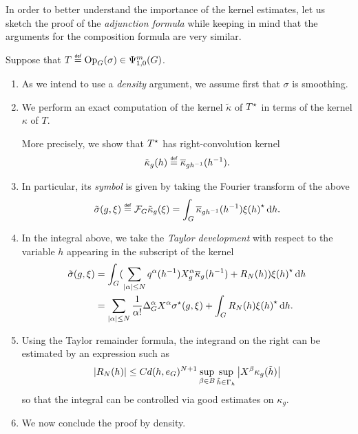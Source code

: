 In order to better understand the importance of the kernel estimates,
let us sketch the proof of the \emph{adjunction formula}
while keeping in mind that the arguments for the composition formula are very similar.

Suppose that $T \defeq \Op(\sigma) \in \OperatorClass m {1, 0}$.

\begin{enumerate}
    \item As we intend to use a \emph{density} argument,
        we assume first that $\sigma$ is smoothing.
    \item We perform an exact computation of the kernel $\tilde \kappa$ of ${T}^\star$ in terms of the kernel $\kappa$ of $T$.

        More precisely, we show that ${T}^\star$ has right-convolution kernel
        \begin{align*}
            \tilde \kappa_g(h) \defeq \conj \kappa_{g h^{-1}}(h^{-1}).
        \end{align*}
    \item
        In particular, its \emph{symbol} is given by taking the Fourier transform of the above
        \begin{align*}
            \tilde \sigma(g, \xi) \defeq \Fourier \tilde \kappa_g(\xi)
            = \int_\Group \conj \kappa_{g h^{-1}}(h^{-1}) \adj{\xi(h)} \dd h.
        \end{align*}
    \item
        In the integral above,
        we take the \emph{Taylor development} with respect to the variable $h$ appearing in the subscript of the kernel
        \begin{align*}
            \tilde \sigma(g, \xi)
            &= \int_\Group (\sum_{\abs \alpha \leq N} q^{\alpha}(h^{-1}) \LeftDifferentialOperator [g] \alpha \conj \kappa_{g}(h^{-1}) + R_N(h)) \adj{\xi(h)} \dd h\\
            &= \sum_{\abs \alpha \leq N} \frac 1 {\alpha!} \DifferenceOperatorOrder \alpha \LeftDifferentialOperator \alpha \adj \sigma(g, \xi) + \int_\Group R_N(h) \adj{\xi(h)} \dd h.
        \end{align*}
    \item
        Using the Taylor remainder formula,
        the integrand on the right can be estimated by an expression such as
        \begin{align*}
            \abs {R_N(h)}
            \leq C d(h, e_\Group)^{N + 1} \sup_{\beta \in B} \sup_{\tilde h \in \Gamma_h} \abs {\LeftDifferentialOperator \beta \kappa_g(\tilde h)}
        \end{align*}
        so that the integral can be controlled via good estimates on $\kappa_g$.
    \item
        We now conclude the proof by density.
\end{enumerate}

